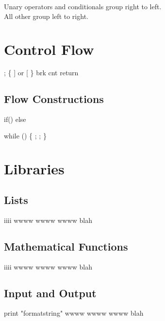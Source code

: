 \documentclass{refcard}
\begin{document}
\noindent
Unary operators and conditionals group right to left.\\
All other group left to right.


\section{Control Flow}

\begin{ldesc}
	        ;
	             \{ ] or [ \}
	             brk
	        cnt
	  return 
\end{ldesc}


\subsection{Flow Constructions}

\begin{ldesc}
	\li[if statement]
		if\s()\s{}     \li
		else\s\s\s\s\s\s\s\s{} \li

		while () \{           \li
		\s\s\s\s{};        \li
		\s\s\s\s{};        \li
	    \}
\end{ldesc}


\section{Libraries}


\subsection{Lists \hfill {}}

\begin{ldesc}
	\li[iiii] iiii
	\li[wwww] wwww
	\li[iiii] wwww
	\li       wwww
	\li[blah] blah
\end{ldesc}

\subsection{Mathematical Functions \hfill {}}

\begin{ldesc}
	\li[iiii] iiii
	\li[wwww] wwww
	\li[iiii] wwww
	\li       wwww
	\li[blah] blah
\end{ldesc}


\subsection{Input and Output \hfill {}}

\begin{ldesc}
	\li[printing] print "formatstring"
	\li[wwww] wwww
	\li[iiii] wwww
	\li       wwww
	\li[blah] blah
\end{ldesc}
\end{document}
